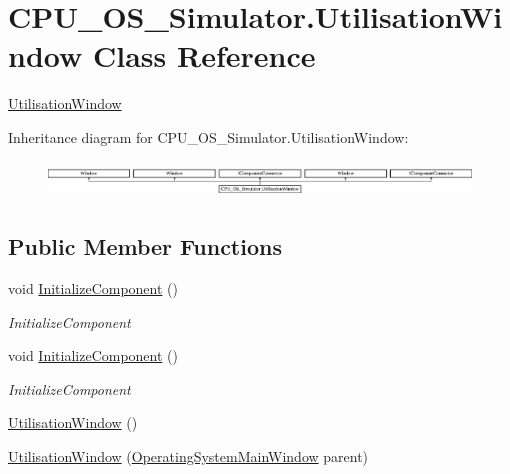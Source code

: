 \hypertarget{class_c_p_u___o_s___simulator_1_1_utilisation_window}{}\section{C\+P\+U\+\_\+\+O\+S\+\_\+\+Simulator.\+Utilisation\+Window Class Reference}
\label{class_c_p_u___o_s___simulator_1_1_utilisation_window}


\hyperlink{class_c_p_u___o_s___simulator_1_1_utilisation_window}{Utilisation\+Window}  


Inheritance diagram for C\+P\+U\+\_\+\+O\+S\+\_\+\+Simulator.\+Utilisation\+Window\+:\begin{figure}[H]
\begin{center}
\leavevmode
\includegraphics[height=0.973913cm]{class_c_p_u___o_s___simulator_1_1_utilisation_window}
\end{center}
\end{figure}
\subsection*{Public Member Functions}
\begin{DoxyCompactItemize}
\item 
void \hyperlink{class_c_p_u___o_s___simulator_1_1_utilisation_window_a59d8abfad27bc39958f00ca7cfb18b3e}{Initialize\+Component} ()
\begin{DoxyCompactList}\small\item\em Initialize\+Component \end{DoxyCompactList}\item 
void \hyperlink{class_c_p_u___o_s___simulator_1_1_utilisation_window_a59d8abfad27bc39958f00ca7cfb18b3e}{Initialize\+Component} ()
\begin{DoxyCompactList}\small\item\em Initialize\+Component \end{DoxyCompactList}\item 
\hyperlink{class_c_p_u___o_s___simulator_1_1_utilisation_window_a49cf31ea8bb70abda6aecdd4de8f4dfe}{Utilisation\+Window} ()
\item 
\hyperlink{class_c_p_u___o_s___simulator_1_1_utilisation_window_a015db78e8cb17406d2d630e129f09f3b}{Utilisation\+Window} (\hyperlink{class_c_p_u___o_s___simulator_1_1_operating_system_main_window}{Operating\+System\+Main\+Window} parent)
\end{DoxyCompactItemize}
